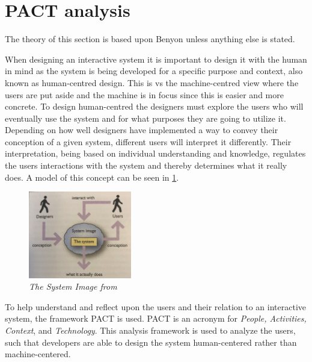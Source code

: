 
\section{PACT analysis}\label{sec:PACT}
The theory of this section is based upon Benyon \cite{Benyon} unless anything else is stated.

When designing an interactive system it is important to design it with the human in mind as the system is being developed for a specific purpose and context, also known as human-centred design.
This is vs the machine-centred view where the users are put aside and the machine is in focus since this is easier and more concrete.
To design human-centred the designers must explore the users who will eventually use the system and for what purposes they are going to utilize it.
Depending on how well designers have implemented a way to convey their conception of a given system, different users will interpret it differently.
Their interpretation, being based on individual understanding and knowledge, regulates the users interactions with the system and thereby determines what it really does.
A model of this concept can be seen in \cref{fig:PACT-SystemImage}.

\begin{figure}[H]
	\centering
	\includegraphics[width=0.4\textwidth]{billeder/SystemImage-Benyon.png}
	\caption{\textit{The System Image from \citep[p.~31]{Benyon}}}
	\label{fig:PACT-SystemImage}
\end{figure}

To help understand and reflect upon the users and their relation to an interactive system, the framework PACT is used.
PACT is an acronym for \textit{People, Activities, Context}, and \textit{Technology}.
This analysis framework is used to analyze the users, such that developers are able to design the system human-centered rather than machine-centered.

